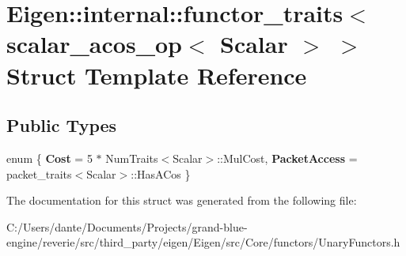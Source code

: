 \hypertarget{struct_eigen_1_1internal_1_1functor__traits_3_01scalar__acos__op_3_01_scalar_01_4_01_4}{}\section{Eigen\+::internal\+::functor\+\_\+traits$<$ scalar\+\_\+acos\+\_\+op$<$ Scalar $>$ $>$ Struct Template Reference}
\label{struct_eigen_1_1internal_1_1functor__traits_3_01scalar__acos__op_3_01_scalar_01_4_01_4}
\subsection*{Public Types}
\begin{DoxyCompactItemize}
\item 
\mbox{\label{struct_eigen_1_1internal_1_1functor__traits_3_01scalar__acos__op_3_01_scalar_01_4_01_4_a57920d3176e531b0131e46620d0b0550}} 
enum \{ {\bfseries Cost} = 5 $\ast$ Num\+Traits$<$Scalar$>$\+::Mul\+Cost, 
{\bfseries Packet\+Access} = packet\+\_\+traits$<$Scalar$>$\+::Has\+A\+Cos
 \}
\end{DoxyCompactItemize}


The documentation for this struct was generated from the following file\+:\begin{DoxyCompactItemize}
\item 
C\+:/\+Users/dante/\+Documents/\+Projects/grand-\/blue-\/engine/reverie/src/third\+\_\+party/eigen/\+Eigen/src/\+Core/functors/Unary\+Functors.\+h\end{DoxyCompactItemize}

